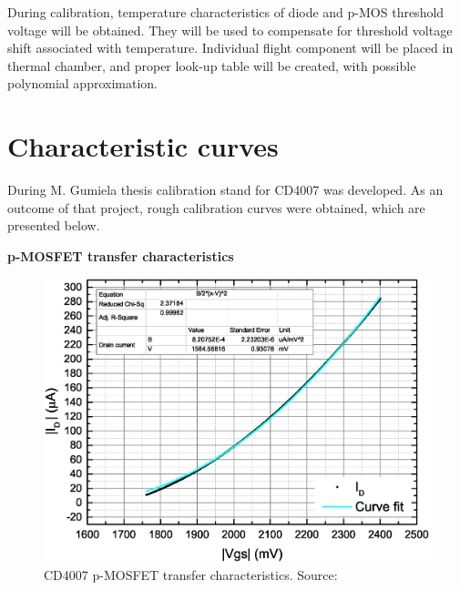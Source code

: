     During calibration, temperature characteristics of diode and p-MOS threshold voltage will be obtained. They will be used to compensate for threshold voltage shift associated with temperature. Individual flight component will be placed in thermal chamber, and proper look-up table will be created, with possible polynomial approximation.


\section{Characteristic curves}
\label{Characteristic_curves}

    During M. Gumiela thesis calibration stand for CD4007 was developed. As an outcome of that project, rough calibration curves were obtained, which are presented below.

    \bigskip \textbf{p-MOSFET transfer characteristics}
    \begin{figure}[H]
        \centering
        \includegraphics[width=0.7\paperwidth]{img/05/mg_iv_mosfet.eps}
        \caption{CD4007 p-MOSFET transfer characteristics. Source: \cite{MGThesis}}
    \end{figure}

